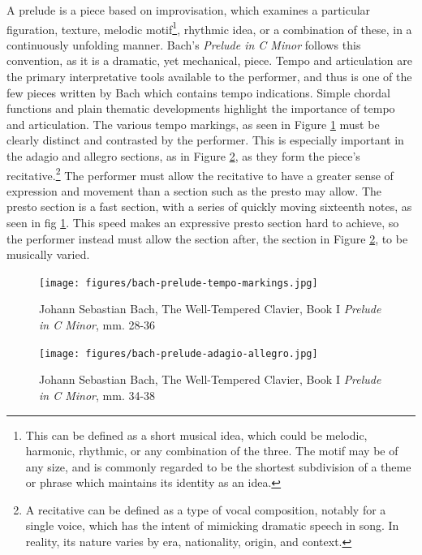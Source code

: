 A prelude is a piece based on improvisation, which examines a particular figuration, texture, melodic motif\autocite{Drabkin_2001}\footnote{This can be defined as a short musical idea, which could be melodic, harmonic, rhythmic, or any combination of the three. The motif may be of any size, and is commonly regarded to be the shortest subdivision of a theme or phrase which maintains its identity as an idea.}, rhythmic idea, or a combination of these, in a continuously unfolding manner. Bach's \textit{Prelude in C Minor} follows this convention, as it is a dramatic, yet mechanical, piece. Tempo and articulation are the primary interpretative tools available to the performer, and thus is one of the few pieces written by Bach which contains tempo indications. Simple chordal functions and plain thematic developments highlight the importance of tempo and articulation. The various tempo markings, as seen in Figure \ref{fig:prelude-tempo-markings}\autocite{Henle_2009} must be clearly distinct and contrasted by the performer. This is especially important in the adagio and allegro sections, as in Figure \ref{fig:prelude-recitative}\autocite{Henle_2009},
as they form the piece's recitative.\footnote{A recitative can be defined as a type of vocal composition, notably for a single voice, which has the intent of mimicking dramatic speech in song. In reality, its nature varies by era, nationality, origin, and context.}\autocite{Monson_Westrup_Budden_2001} The performer must allow the recitative to have a greater sense of expression and movement than a section such as the presto may allow. The presto section is a fast section, with a series of quickly moving sixteenth notes, as seen in fig \ref{fig:prelude-tempo-markings}\autocite{Henle_2009}. This speed makes an expressive presto section hard to achieve, so the performer instead must allow the section after, the section in Figure \ref{fig:prelude-recitative}\autocite{Henle_2009}, to be musically varied. 

\begin{figure}
    \centering
    \texttt{[image: figures/bach-prelude-tempo-markings.jpg]}
    \caption{Johann Sebastian Bach, The Well-Tempered Clavier, Book I \textit{Prelude in C Minor}, mm. 28-36}
    \label{fig:prelude-tempo-markings}
\end{figure}

\begin{figure}
    \centering
    \texttt{[image: figures/bach-prelude-adagio-allegro.jpg]}
    \caption{Johann Sebastian Bach, The Well-Tempered Clavier, Book I \textit{Prelude in C Minor}, mm. 34-38}
    \label{fig:prelude-recitative}
\end{figure}

